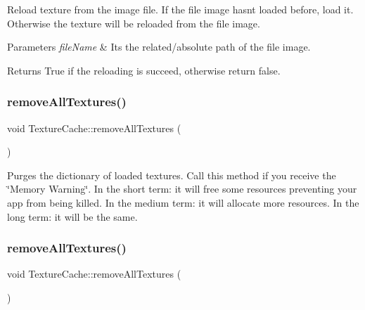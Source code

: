 Reload texture from the image file. If the file image hasn\textquotesingle{}t loaded before, load it. Otherwise the texture will be reloaded from the file image. 
\begin{DoxyParams}{Parameters}
{\em file\+Name} & It\textquotesingle{}s the related/absolute path of the file image. \\
\hline
\end{DoxyParams}
\begin{DoxyReturn}{Returns}
True if the reloading is succeed, otherwise return false. 
\end{DoxyReturn}
\mbox{\label{classTextureCache_a860e0ed7bd403b85e91cec4b03057d61}} 
\subsubsection{\texorpdfstring{remove\+All\+Textures()}{removeAllTextures()}\hspace{0.1cm}{\footnotesize\ttfamily [1/2]}}
{\footnotesize\ttfamily void Texture\+Cache\+::remove\+All\+Textures (\begin{DoxyParamCaption}{ }\end{DoxyParamCaption})}

Purges the dictionary of loaded textures. Call this method if you receive the \char`\"{}\+Memory Warning\char`\"{}. In the short term\+: it will free some resources preventing your app from being killed. In the medium term\+: it will allocate more resources. In the long term\+: it will be the same. \mbox{\label{classTextureCache_a860e0ed7bd403b85e91cec4b03057d61}} 
\subsubsection{\texorpdfstring{remove\+All\+Textures()}{removeAllTextures()}\hspace{0.1cm}{\footnotesize\ttfamily [2/2]}}
{\footnotesize\ttfamily void Texture\+Cache\+::remove\+All\+Textures (\begin{DoxyParamCaption}{ }\end{DoxyParamCaption})}

